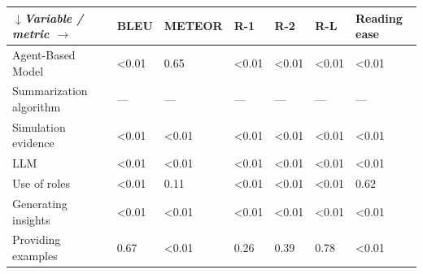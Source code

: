 \begin{tabular}{|l|l|l|l|l|l|l|}
\hline
\textit{$\downarrow$Variable / metric $\rightarrow$} & BLEU & METEOR & R-1 & R-2 & R-L & Reading ease \\
 \hline
 Agent-Based Model & \textless{}0.01 & 0.65 & \textless{}0.01 & \textless{}0.01 & \textless{}0.01 & \textless{}0.01 \\
 \hline
 Summarization algorithm & — & — & — & — & — & — \\
 \hline
 Simulation evidence & \textless{}0.01 & \textless{}0.01 & \textless{}0.01 & \textless{}0.01 & \textless{}0.01 & \textless{}0.01 \\
 \hline
 LLM & \textless{}0.01 & \textless{}0.01 & \textless{}0.01 & \textless{}0.01 & \textless{}0.01 & \textless{}0.01 \\
 \hline
 Use of roles & \textless{}0.01 & 0.11 & \textless{}0.01 & \textless{}0.01 & \textless{}0.01 & 0.62 \\
 \hline
 Generating insights & \textless{}0.01 & \textless{}0.01 & \textless{}0.01 & \textless{}0.01 & \textless{}0.01 & \textless{}0.01 \\
 \hline
 Providing examples & 0.67 & \textless{}0.01 & 0.26 & 0.39 & 0.78 & \textless{}0.01 \\
\hline
\end{tabular}
